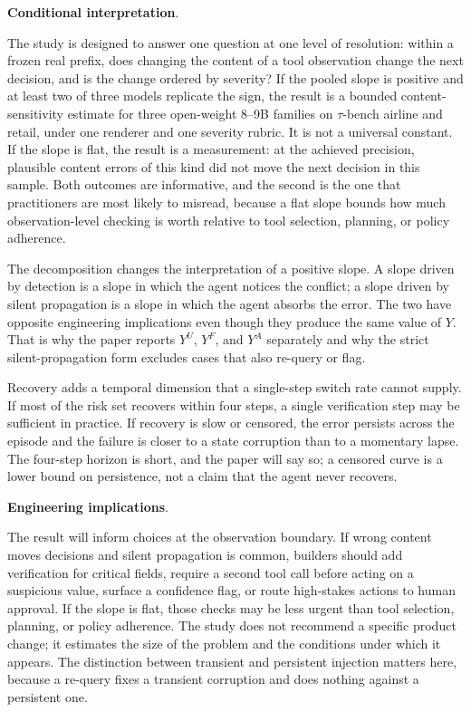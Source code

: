 \documentclass[a4paper,fleqn]{cas-sc}
\begin{document}
\noindent\textbf{Conditional interpretation}.\

The study is designed to answer one question at one level of resolution: within a frozen real
prefix, does changing the content of a tool observation change the next decision, and is the
change ordered by severity? If the pooled slope is positive and at least two of three models
replicate the sign, the result is a bounded content-sensitivity estimate for three open-weight
8--9B families on $\tau$-bench airline and retail, under one renderer and one severity rubric. It
is not a universal constant. If the slope is flat, the result is a measurement: at the achieved
precision, plausible content errors of this kind did not move the next decision in this sample.
Both outcomes are informative, and the second is the one that practitioners are most likely to
misread, because a flat slope bounds how much observation-level checking is worth relative to
tool selection, planning, or policy adherence.

The decomposition changes the interpretation of a positive slope. A slope driven by detection is
a slope in which the agent notices the conflict; a slope driven by silent propagation is a slope
in which the agent absorbs the error. The two have opposite engineering implications even though
they produce the same value of $Y$. That is why the paper reports $Y^{U}$, $Y^{F}$, and $Y^{A}$
separately and why the strict silent-propagation form excludes cases that also re-query or flag.

Recovery adds a temporal dimension that a single-step switch rate cannot supply. If most of the
risk set recovers within four steps, a single verification step may be sufficient in practice. If
recovery is slow or censored, the error persists across the episode and the failure is closer to
a state corruption than to a momentary lapse. The four-step horizon is short, and the paper will
say so; a censored curve is a lower bound on persistence, not a claim that the agent never
recovers.

\noindent\textbf{Engineering implications}.\

The result will inform choices at the observation boundary. If wrong content moves decisions and
silent propagation is common, builders should add verification for critical fields, require a
second tool call before acting on a suspicious value, surface a confidence flag, or route
high-stakes actions to human approval. If the slope is flat, those checks may be less urgent than
tool selection, planning, or policy adherence. The study does not recommend a specific product
change; it estimates the size of the problem and the conditions under which it appears. The
distinction between transient and persistent injection matters here, because a re-query fixes a
transient corruption and does nothing against a persistent one.
\end{document}
